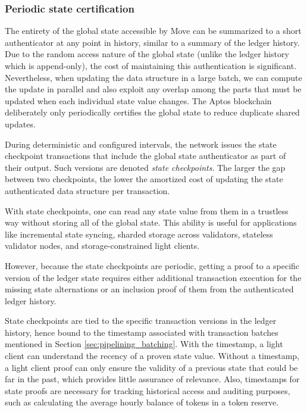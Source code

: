 \documentclass{article}
\begin{document}
\subsubsection{Periodic state certification}
\label{subsubsec:period_state_certification}

The entirety of the global state accessible by Move can be summarized to a short authenticator at any point in history, similar to a summary of the ledger history. Due to the random access nature of the global state (unlike the ledger history which is append-only), the cost of maintaining this authentication is significant. Nevertheless, when updating the data structure in a large batch, we can compute the update in parallel and also exploit any overlap among the parts that must be updated when each individual state value changes. The Aptos blockchain deliberately only periodically certifies the global state to reduce duplicate shared updates.

During deterministic and configured intervals, the network issues the state checkpoint transactions that include the global state authenticator as part of their output. Such versions are denoted \emph{state checkpoints}. The larger the gap between two checkpoints, the lower the amortized cost of updating the state authenticated data structure per transaction.

With state checkpoints, one can read any state value from them in a trustless way without storing all of the global state. This ability is useful for applications like incremental state syncing, sharded storage across validators, stateless validator nodes, and storage-constrained light clients. 

However, because the state checkpoints are periodic, getting a proof to a specific version of the ledger state requires either additional transaction execution for the missing state alternations or an inclusion proof of them from the authenticated ledger history. 

State checkpoints are tied to the specific transaction versions in the ledger history, hence bound to the timestamp associated with transaction batches mentioned in Section \ref{sec:pipelining_batching}. With the timestamp, a light client can understand the recency of a proven state value. Without a timestamp, a light client proof can only ensure the validity of a previous state that could be far in the past, which provides little assurance of relevance. Also, timestamps for state proofs are necessary for tracking historical access and auditing purposes, such as calculating the average hourly balance of tokens in a token reserve.
\end{document}
